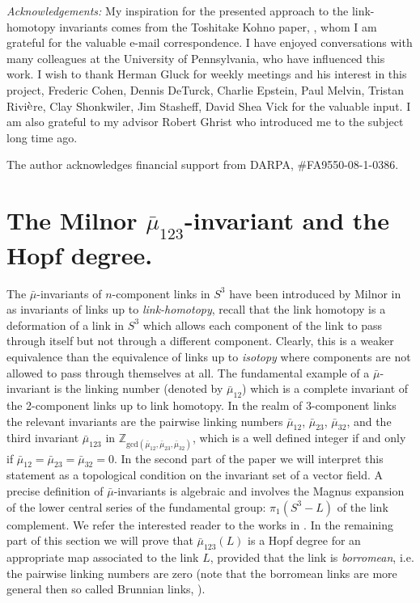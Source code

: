 \documentclass[12pt]{article}
\newcommand{\no}{\noindent}
\begin{document}
\bigskip
\no\emph{Acknowledgements:} My inspiration for the presented approach to the link-homotopy invariants  comes from the Toshitake Kohno paper, \cite{Kohno02}, whom I am grateful for the valuable e-mail correspondence. I have enjoyed conversations with many colleagues at the University of Pennsylvania, who have influenced this work. I wish to thank Herman Gluck for weekly meetings and his interest in this project, Frederic Cohen, Dennis DeTurck, Charlie Epstein, Paul Melvin, Tristan Rivi$\grave{\rm e}$re, Clay Shonkwiler, Jim Stasheff, David Shea Vick for the valuable input.  I am also grateful to my advisor 
Robert Ghrist who introduced me to the subject long time ago.

 The author acknowledges financial support from DARPA, \#FA9550-08-1-0386.



\section{The Milnor $\bar{\mu}_{123}$-invariant and the Hopf degree.}\label{sec:mu-and-hopf}

The $\bar{\mu}$-invariants of $n$-component links in $S^3$ have been introduced by Milnor in \cite{Milnor54, Milnor57}
as invariants of links up to \emph{link-homotopy}, recall that the link homotopy 
is a deformation of a link in $S^3$ which allows each component of the link to pass through 
itself but not through a different component. Clearly, this is a weaker equivalence than the equivalence of links up to \emph{isotopy} where components are not allowed to pass through themselves at all. The fundamental example of a $\bar{\mu}$-invariant is the linking number (denoted by $\bar{\mu}_{12}$) which is a complete invariant of the 2-component links up to link homotopy. In the realm of 3-component links the relevant invariants are the pairwise linking numbers $\bar{\mu}_{12}$, $\bar{\mu}_{23}$, $\bar{\mu}_{32}$, and the third invariant $\bar{\mu}_{123}$ in $\mathbb{Z}_{\text{gcd}(\bar{\mu}_{12}, \bar{\mu}_{23}, \bar{\mu}_{32})}$, which is 
a well defined integer if and only if $\bar{\mu}_{12}=\bar{\mu}_{23}=\bar{\mu}_{32}=0$. In the second part of the paper we will interpret this statement as a topological condition on the invariant set of a vector  field. A precise definition of $\bar{\mu}$-invariants is algebraic and involves the Magnus expansion of the lower central series of the fundamental group: $\pi_1(S^3-L)$ of the link complement. We refer the interested reader to the works in \cite{Milnor54, Milnor57}. In the remaining part of this section we will prove that $\bar{\mu}_{123}(L)$ is a Hopf degree for an appropriate map associated to the link $L$, provided that 
the link is \emph{borromean}, i.e. the pairwise linking numbers are zero (note that the borromean links are more general then so called Brunnian links, \cite{Milnor54}). 
\end{document}
